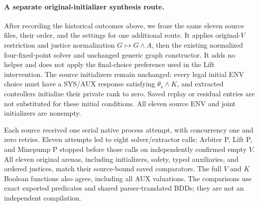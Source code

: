 \paragraph{A separate original-initializer synthesis route.}
\label{supp:normalized-eleven}
After recording the historical outcomes above, we froze the same eleven
source files, their order, and the settings for one additional route.
It applies original-$V$ restriction and justice normalization
$G\mapsto G\land A$, then the existing normalized four-fixed-point
solver and unchanged generic graph constructor. It adds no helper and
does not apply the final-choice preference used in the Lift intervention.
The source initializers remain unchanged: every legal initial ENV choice
must have a SYS/AUX response satisfying $\theta_s\land K$, and extracted
controllers initialize their private rank to zero. Saved replay or
residual entries are not substituted for these initial conditions.
All eleven source ENV and joint initializers are nonempty.

Each source received one serial native process attempt, with concurrency
one and zero retries. Eleven attempts led to eight solver/extractor calls;
Arbiter P, Lift P, and Minepump P stopped before those calls on independently
confirmed empty $V$. All eleven original arenas, including initializers,
safety, typed auxiliaries, and ordered justices, match their source-bound
saved comparators. The full $V$ and $K$ Boolean functions also agree,
including all AUX valuations. The comparisons use exact exported predicates
and shared parser-translated BDDs; they are not an independent compilation.

